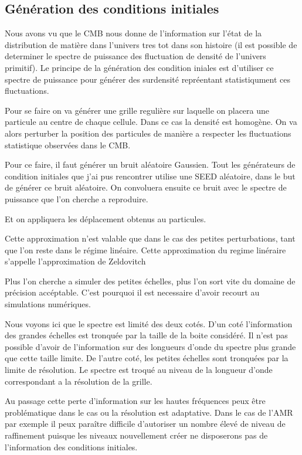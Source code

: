 \subsection{Génération des conditions initiales}

Nous avons vu %
que le CMB nous donne de l'information sur l'état de la distribution de matière dans l'univers tres tot dans son histoire (il est possible de determiner le spectre de puissance des fluctuation de densité de l'univers primitif).
Le principe de la génération des condition iniales est d'utiliser ce spectre de puissance pour générer des surdensité repréentant statistiqument ces fluctuations.

Pour se faire on va générer une grille regulière sur laquelle on placera une particule au centre de chaque cellule.
Dans ce cas la densité est homogène.
On va alors perturber la position des particules de manière a respecter les fluctuations statistique observées dans le CMB.

Pour ce faire, il faut générer un bruit aléatoire Gaussien.
Tout les générateurs de condition initiales que j'ai pus rencontrer utilise une SEED aléatoire, dans le but de générer ce bruit aléatoire.
On convoluera ensuite ce bruit avec le spectre de puissance que l'on cherche a reproduire.

Et on appliquera les déplacement obtenus au particules.

Cette approximation n'est valable que dans le cas des petites perturbations, tant que l'on reste dans le régime linéaire.
Cette approximation du regime linéraire s'appelle l’approximation de Zeldovitch %
\cite{2014MNRAS.439.3630W}


Plus l'on cherche a simuler des petites échelles, plus l'on sort vite du domaine de précision accéptable.
C'est pourquoi il est necessaire d'avoir recourt au simulations numériques.

Nous voyons ici que le spectre est limité des deux cotés.
D'un coté l'information des grandes échelles est tronquée par la taille de la boite considéré.
Il n'est pas possible d'avoir de l’information sur des longueurs d'onde du spectre plus grande que cette taille limite.
De l'autre coté, les petites échelles sont tronquées par la limite de résolution.
Le spectre est troqué au niveau de la longueur d'onde correspondant a la résolution de la grille.

Au passage cette perte d'information sur les hautes fréquences peux être problématique dans le cas ou la résolution est adaptative.
Dans le cas de l'AMR par exemple il peux paraître difficile d'autoriser un nombre élevé de niveau de raffinement puisque les niveaux nouvellement créer ne disposerons pas de l'information des conditions initiales.

